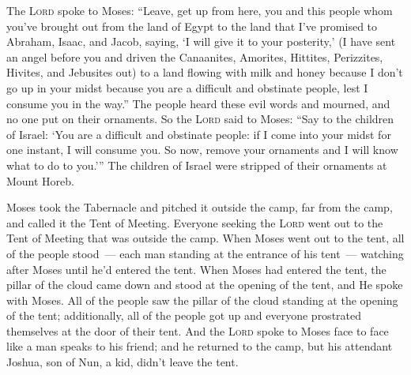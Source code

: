 
\begin{inparaenum}
     The \textsc{Lord} spoke to Moses: ``Leave, get up from here, you and this people whom you've brought out from the land of Egypt to the land that I've promised to Abraham, Isaac, and Jacob, saying, `I will give it to your posterity,'%
     (I have sent an angel before you and driven the Canaanites, Amorites, Hittites, Perizzites, Hivites, and Jebusites out)%
     to a land flowing with milk and honey because I don't go up in your midst because you are a difficult and obstinate people, lest I consume you in the way.''%
     The people heard these evil words and mourned, and no one put on their ornaments.%
     So the \textsc{Lord} said to Moses: ``Say to the children of Israel: `You are a difficult and obstinate people: if I come into your midst for one instant, I will consume you. So now, remove your ornaments and I will know what to do to you.'\thinspace''%
     The children of Israel were stripped of their ornaments at Mount Horeb.%
    
     Moses took the Tabernacle and pitched it outside the camp, far from the camp, and called it the Tent of Meeting. Everyone seeking the \textsc{Lord} went out to the Tent of Meeting that was outside the camp.%
     When Moses went out to the tent, all of the people stood~--- each man standing at the entrance of his tent~--- watching after Moses until he'd entered the tent.%
     When Moses had entered the tent, the pillar of the cloud came down and stood at the opening of the tent, and He spoke with Moses.%
     All of the people saw the pillar of the cloud standing at the opening of the tent; additionally, all of the people got up and everyone prostrated themselves at the door of their tent.%
     And the \textsc{Lord} spoke to Moses face to face like a man speaks to his friend; and he returned to the camp, but his attendant Joshua, son of Nun, a kid, didn't leave the tent.%
    

\end{inparaenum}
